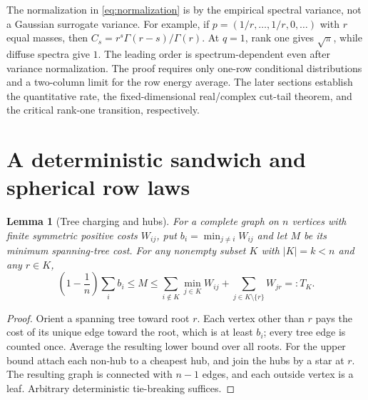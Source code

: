 \documentclass[11pt]{article}
\newtheorem{lemma}[theorem]{Lemma}
\begin{document}
The normalization in \eqref{eq:normalization} is by the empirical spectral variance, not a Gaussian surrogate variance. For example, if $p=(1/r,\ldots,1/r,0,\ldots)$ with $r$ equal masses, then $C_s=r^s\Gamma(r-s)/\Gamma(r)$. At $q=1$, rank one gives $\sqrt\pi$, while diffuse spectra give $1$. The leading order is spectrum-dependent even after variance normalization. The proof requires only one-row conditional distributions and a two-column limit for the row energy average. The later sections establish the quantitative rate, the fixed-dimensional real/complex cut-tail theorem, and the critical rank-one transition, respectively.

\section{A deterministic sandwich and spherical row laws}
\begin{lemma}[Tree charging and hubs]\label{lem:tree}
For a complete graph on $n$ vertices with finite symmetric positive costs $W_{ij}$, put $b_i=\min_{j\ne i}W_{ij}$ and let $M$ be its minimum spanning-tree cost. For any nonempty subset $K$ with $|K|=k<n$ and any $r\in K$,
\begin{equation}
\left(1-\frac1n\right)\sum_i b_i\le M\le
\sum_{i\notin K}\min_{j\in K}W_{ij}+\sum_{j\in K\setminus\{r\}}W_{jr}=:T_K.
\label{eq:tree}
\end{equation}
\end{lemma}
\begin{proof}
Orient a spanning tree toward root $r$. Each vertex other than $r$ pays the cost of its unique edge toward the root, which is at least $b_i$; every tree edge is counted once. Average the resulting lower bound over all roots. For the upper bound attach each non-hub to a cheapest hub, and join the hubs by a star at $r$. The resulting graph is connected with $n-1$ edges, and each outside vertex is a leaf. Arbitrary deterministic tie-breaking suffices.
\end{proof}
\end{document}
